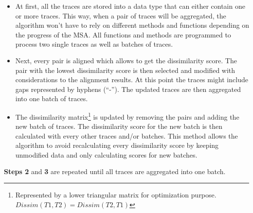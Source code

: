 \documentclass[12pt,a4paper]{article}
\begin{document}
\begin{itemize}
\item[\textbf{Step 1}] At first, all the traces are stored into a data type that can either contain one or more traces.
This way, when a pair of traces will be aggregated, the algorithm won't have to rely on different methods and functions depending on the progress of the MSA.
All functions and methods are programmed to process two single traces as well as batches of traces.

\item[\textbf{Step 2}] Next, every pair is aligned which allows to get the dissimilarity score.
The pair with the lowest dissimilarity score is then selected and modified with considerations to the alignment results.
At this point the traces might include gaps represented by hyphens (``-'').
The updated traces are then aggregated into one batch of traces.

\item[\textbf{Step 3}] The dissimilarity matrix\footnote{Represented by a lower triangular matrix for optimization purpose. $Dissim(T1, T2) = Dissim(T2, T1)$} is updated by removing the pairs and adding the new batch of traces.
The dissimilarity score for the new batch is then calculated with every other traces and/or batches.
This method allows the algorithm to avoid recalculating every dissimilarity score by keeping unmodified data and only calculating scores for new batches.
\end{itemize}

\textbf{Steps 2} and \textbf{3} are repeated until all traces are aggregated into one batch.
\end{document}
